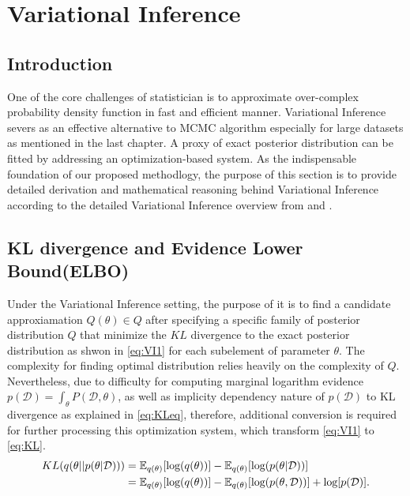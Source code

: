 \section{Variational Inference}
\label{VI}
\subsection{Introduction}
One of the core challenges of statistician is to approximate over-complex probability density function in fast and efficient manner. Variational Inference severs as an effective alternative to MCMC algorithm especially for large datasets as mentioned in the last chapter. A proxy of exact posterior distribution can be fitted by addressing an optimization-based system. As the indispensable foundation of our proposed methodlogy, the purpose of this section is to provide detailed derivation and mathematical reasoning behind Variational Inference according to the detailed Variational Inference overview from \cite{blei_kucukelbir_mcauliffe_2017} and \cite{bishop_2006}.
\subsection{KL divergence and Evidence Lower Bound(ELBO)}
Under the Variational Inference setting, the purpose of it is to find a candidate approxiamation  $Q(\theta) \in Q$ after specifying a specific family of posterior distribution $Q$ that minimize the $KL$ divergence to the exact posterior distribution as shwon in \autoref{eq:VI1} for each subelement of parameter $\theta$. The complexity for finding optimal distribution relies heavily on the complexity of $Q$. Nevertheless, due to difficulty for computing marginal logarithm evidence $p(\mathcal{D}) = \int_{\theta} P(\mathcal{D},\theta)$, as well as implicity dependency nature of $p(\mathcal{D})$ to KL divergence as explained in \autoref{eq:KLeq}, therefore, additional conversion is required for further processing this optimization system, which transform \autoref{eq:VI1} to \autoref{eq:KL}. 
\begin{equation}
	\label{eq:KLeq}
	\begin{aligned}
		KL(q(\theta||p(\theta|\mathcal{D}))) &= \mathop{\mathbb{E}_{q(\theta)}}[\textnormal{log}(q(\theta))] - \mathop{\mathbb{E}_{q(\theta)}}[\textnormal{log}(p(\theta|\mathcal{D}))]\\
		& = 
		\mathop{\mathbb{E}_{q(\theta)}}[\textnormal{log}(q(\theta))] - \mathop{\mathbb{E}_{q(\theta)}}[\textnormal{log}(p(\theta,\mathcal{D}))]+ \textnormal{log}[p(\mathcal{D})].\\
	\end{aligned}
\end{equation}
